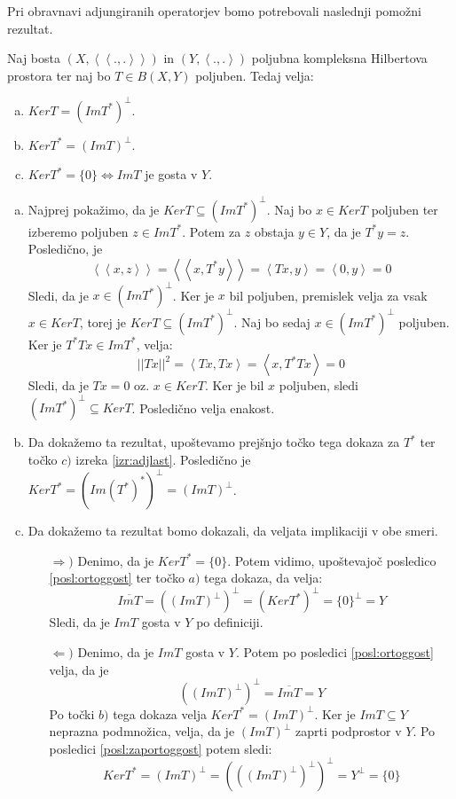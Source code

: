 \documentclass[mat2]{matdelo}
\newcommand{\abs}[1]{\ensuremath{\lvert #1 \rvert}}
\newcommand{\norm}[1]{\abs{\abs{#1}}}
\newcommand{\Sp}[2]{\ensuremath{\left<#1, #2\right>}}
\newcommand{\Spp}[2]{\ensuremath{\left<\left<#1, #2\right>\right>}}
\begin{document}
			Pri obravnavi adjungiranih operatorjev bomo potrebovali naslednji pomožni rezultat.
			\begin{lema}
				\label{lem:adjlast2}
				Naj bosta $(X, \Spp{.}{.})$ in $(Y, \Sp{.}{.})$ poljubna kompleksna Hilbertova prostora ter naj bo $T\in B(X, Y)$ poljuben. Tedaj velja: \begin{enumerate}[a)]
					\item $KerT = (ImT^*)^{\bot}$.
					\item $KerT^* = (ImT)^{\bot}$.
					\item $KerT^* = \{0\} \iff ImT$ je gosta v $Y$.
				\end{enumerate}
			\end{lema}
			
			\begin{dokaz}
				\begin{enumerate}[a)]
					\item Najprej pokažimo, da je $KerT \subseteq (ImT^*)^\bot$. Naj bo $x\in KerT$ poljuben ter izberemo poljuben $z\in ImT^*$. Potem za $z$ obstaja $y\in Y$, da je $T^*y = z$. Posledično, je $$\Spp{x}{z} = \Spp{x}{T^*y} = \Sp{Tx}{y} = \Sp{0}{y} = 0$$
					Sledi, da je $x\in (ImT^*)^\bot$. Ker je $x$ bil poljuben, premislek velja za vsak $x\in KerT$, torej je $KerT \subseteq (ImT^*)^\bot$.
					Naj bo sedaj $x\in (ImT^*)^\bot$ poljuben. Ker je $T^*Tx \in ImT^*$, velja: $$\norm{Tx}^2 = \Sp{Tx}{Tx} = \Sp{x}{T^*Tx}= 0$$
					Sledi, da je $Tx = 0$ oz. $x\in KerT$. Ker je bil $x$ poljuben, sledi $(ImT^*)^\bot \subseteq KerT$. Posledično velja enakost.
					\item Da dokažemo ta rezultat, upoštevamo prejšnjo točko tega dokaza za $T^*$ ter točko $c)$ izreka \ref{izr:adjlast}. Posledično je $KerT^* = (Im(T^*)^*)^\bot = (ImT)^\bot$.
					\item Da dokažemo ta rezultat bomo dokazali, da veljata implikaciji v obe smeri. \begin{itemize}
						\item[$\Rightarrow)$] Denimo, da je $KerT^* = \{0\}$. Potem vidimo, upoštevajoč posledico \ref{posl:ortoggost} ter točko $a)$ tega dokaza, da velja: $$\overline{ImT} = ((ImT)^\bot)^\bot = (KerT^*)^\bot = \{0\}^\bot = Y$$
						Sledi, da je $ImT$ gosta v $Y$ po definiciji.
						\item[$\Leftarrow)$] Denimo, da je $ImT$ gosta v $Y$. Potem po posledici \ref{posl:ortoggost} velja, da je $$((ImT)^{\bot})^\bot = \overline{ImT} = Y$$ Po točki $b)$ tega dokaza velja $KerT^* = (ImT)^\bot$. Ker je $ImT\subseteq Y$ neprazna podmnožica, velja, da je $(ImT)^\bot$ zaprti podprostor v $Y$. Po posledici \ref{posl:zaportoggost} potem sledi: $$KerT^* = (ImT)^\bot =(((ImT)^\bot)^\bot)^\bot = Y^\bot = \{0\}$$
					\end{itemize} 
					
				\end{enumerate}
			\end{dokaz}
\end{document}
